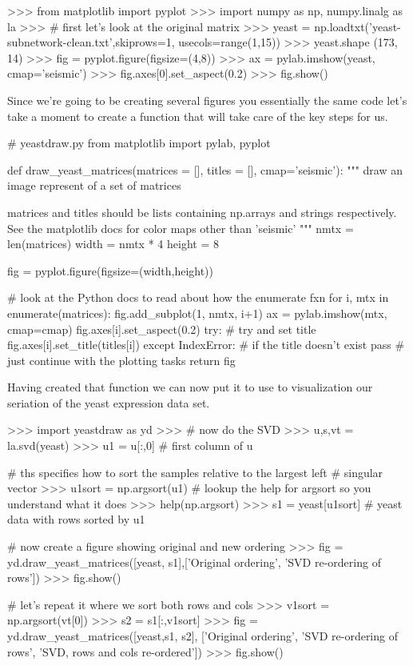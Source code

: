 \begin{python}
>>> from matplotlib import pyplot
>>> import numpy as np, numpy.linalg as la
>>> # first let's look at the original matrix
>>> yeast = np.loadtxt('yeast-subnetwork-clean.txt',skiprows=1, usecols=range(1,15))
>>> yeast.shape
(173, 14)
>>> fig = pyplot.figure(figsize=(4,8))
>>> ax = pylab.imshow(yeast, cmap='seismic')
>>> fig.axes[0].set_aspect(0.2)
>>> fig.show() 
\end{python}

Since we're going to be creating several figures you essentially the same code let's take a moment to create a function that will take care of the key steps for us.

\begin{codeblock}[python]
# yeastdraw.py
from matplotlib import pylab, pyplot

def draw_yeast_matrices(matrices = [], titles = [], cmap='seismic'):
    """ draw an image represent of a set of matrices
    
    matrices and titles should be lists containing np.arrays and strings
    respectively. See the matplotlib docs for color maps other than 'seismic'
    """
    nmtx = len(matrices)
    width = nmtx * 4
    height = 8
    
    fig = pyplot.figure(figsize=(width,height))
    
    # look at the Python docs to read about how the enumerate fxn
    for i, mtx in enumerate(matrices):
        fig.add_subplot(1, nmtx, i+1)
        ax = pylab.imshow(mtx, cmap=cmap)
        fig.axes[i].set_aspect(0.2)
        try:  # try and set title
            fig.axes[i].set_title(titles[i])
        except IndexError:  # if the title doesn't exist
            pass            # just continue with the plotting tasks
    return fig
    
\end{codeblock}

Having created that function we can now put it to use to visualization our seriation of the yeast expression data set.


\begin{python}
>>> import yeastdraw as yd    
>>> # now do the SVD   
>>> u,s,vt = la.svd(yeast)
>>> u1 = u[:,0] # first column of u

# ths specifies how to sort the samples relative to the largest left 
# singular vector
>>> u1sort = np.argsort(u1) 
# lookup the help for argsort so you understand what it does
>>> help(np.argsort)  
>>> s1 = yeast[u1sort] # yeast data with rows sorted by u1

# now create a figure showing original and new ordering
>>> fig = yd.draw_yeast_matrices([yeast, s1],['Original ordering',
                                             'SVD re-ordering of rows'])
>>> fig.show()

# let's repeat it where we sort both rows and cols
>>> v1sort = np.argsort(vt[0])
>>> s2 = s1[:,v1sort]
>>> fig = yd.draw_yeast_matrices([yeast,s1, s2],
        ['Original ordering', 'SVD re-ordering of rows',
        'SVD, rows and cols re-ordered'])
>>> fig.show()
\end{python}

